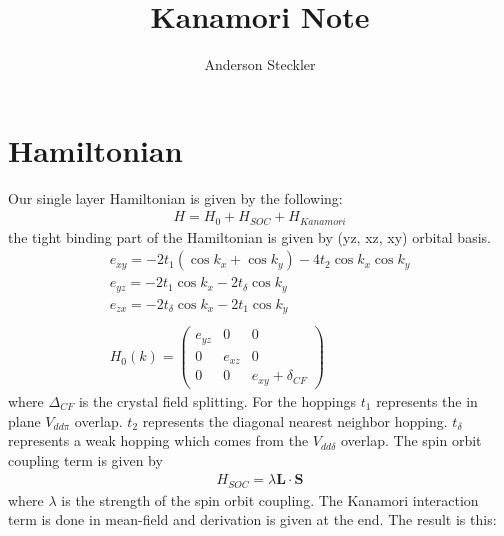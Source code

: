 \documentclass[11pt]{article}
\title{Kanamori Note}
\author{Anderson Steckler}
\date{}
\begin{document}
\maketitle
\section{Hamiltonian}
Our single layer Hamiltonian is given by the following:
\begin{gather}
    H = H_0 + H_{SOC} + H_{Kanamori}
\end{gather}
the tight binding part of the Hamiltonian is given by (yz, xz, xy) orbital basis.
\begin{gather}
    e_{xy} = -2 t_1(\cos k_x + \cos k_y)-4 t_2 \cos k_x \cos k_y \\
    e_{yz} = -2 t_1 \cos k_x - 2 t_{\delta} \cos k_y \\
    e_{zx} = -2 t_\delta \cos k_x - 2 t_1 \cos k_y\\
    \\
    H_0(k) = \begin{pmatrix}
        e_{yz} & 0 & 0 \\
        0 & e_{xz} & 0 \\
        0 & 0 & e_{xy} + \delta_{CF}
    \end{pmatrix}
\end{gather}
where $\Delta_{CF}$ is the crystal field splitting. For the hoppings $t_1$ represents 
the in plane $V_{dd\pi}$ overlap. $t_2$ represents the diagonal nearest neighbor hopping.
$t_\delta$ represents a weak hopping which comes from the $V_{dd\delta}$ overlap.
The spin orbit coupling term is given by
\begin{gather}
    H_{SOC} = \lambda \bm{L} \cdot \bm{S}
\end{gather}
where $\lambda$ is the strength of the spin orbit coupling. 
The Kanamori interaction term is done in mean-field and derivation is given at the end. The result is this:
\end{document}
